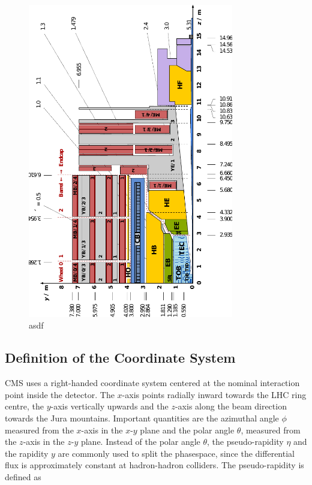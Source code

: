 \begin{figure}[htp]
    \centering
    \includegraphics[width=0.8\textwidth]{figures/cms_detector/cms_longitudinal_section.pdf}
    \caption[Longitudinal section of the CMS detector]{asdf}
    \label{fig:cms:longitudinal_section}
\end{figure}


\subsection{Definition of the Coordinate System}

CMS uses a right-handed coordinate system centered at the nominal interaction point inside the
detector. The $x$-axis points radially inward towards the LHC ring centre, the
$y$-axis vertically upwards and the $z$-axis along the beam direction towards
the Jura mountains. Important quantities are the azimuthal angle $\phi$
measured from the $x$-axis in the $x$-$y$ plane and the polar angle $\theta$,
measured from the $z$-axis in the $z$-$y$ plane. Instead of the polar angle
$\theta$, the pseudo-rapidity $\eta$ and the rapidity $y$ are commonly used to
split the phasespace, since the differential flux is approximately constant at
hadron-hadron colliders. The pseudo-rapidity is defined as

